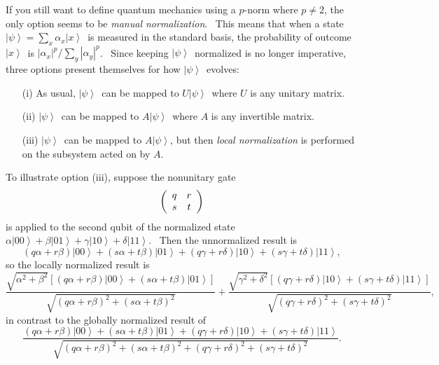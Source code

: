 \documentclass{article}%
\begin{document}
If you still want to define quantum mechanics using a $p$-norm where $p\neq2$,
the only option seems to be \textit{manual normalization}. \ This means that
when a state $\left\vert \psi\right\rangle =\sum_{x}\alpha_{x}\left\vert
x\right\rangle $\ is measured in the standard basis, the probability of
outcome $\left\vert x\right\rangle $\ is $\left\vert \alpha_{x}\right\vert
^{p}/\sum_{y}\left\vert \alpha_{y}\right\vert ^{p}$. \ Since keeping
$\left\vert \psi\right\rangle $\ normalized is no longer imperative, three
options present themselves for how $\left\vert \psi\right\rangle $\ evolves:

\begin{enumerate}
\item[(i)] As usual, $\left\vert \psi\right\rangle $\ can be mapped to
$U\left\vert \psi\right\rangle $\ where $U$ is any unitary matrix.

\item[(ii)] $\left\vert \psi\right\rangle $\ can be mapped to $A\left\vert
\psi\right\rangle $\ where $A$ is any invertible matrix.

\item[(iii)] $\left\vert \psi\right\rangle $\ can be mapped to $A\left\vert
\psi\right\rangle $, but then \textit{local normalization} is performed on the
subsystem acted on by $A$.
\end{enumerate}

To illustrate option (iii), suppose the nonunitary gate%
\[
\left(
\begin{array}
[c]{cc}%
q & r\\
s & t
\end{array}
\right)
\]
is applied to the second qubit of the normalized state $\alpha\left|
00\right\rangle +\beta\left|  01\right\rangle +\gamma\left|  10\right\rangle
+\delta\left|  11\right\rangle $. \ Then the unnormalized result is%
\[
\left(  q\alpha+r\beta\right)  \left|  00\right\rangle +\left(  s\alpha
+t\beta\right)  \left|  01\right\rangle +\left(  q\gamma+r\delta\right)
\left|  10\right\rangle +\left(  s\gamma+t\delta\right)  \left|
11\right\rangle ,
\]
so the locally normalized result is%
\[
\frac{\sqrt{\alpha^{2}+\beta^{2}}\left[  \left(  q\alpha+r\beta\right)
\left|  00\right\rangle +\left(  s\alpha+t\beta\right)  \left|
01\right\rangle \right]  }{\sqrt{\left(  q\alpha+r\beta\right)  ^{2}+\left(
s\alpha+t\beta\right)  ^{2}}}+\frac{\sqrt{\gamma^{2}+\delta^{2}}\left[
\left(  q\gamma+r\delta\right)  \left|  10\right\rangle +\left(
s\gamma+t\delta\right)  \left|  11\right\rangle \right]  }{\sqrt{\left(
q\gamma+r\delta\right)  ^{2}+\left(  s\gamma+t\delta\right)  ^{2}}},
\]
in contrast to the globally normalized result of%
\[
\frac{\left(  q\alpha+r\beta\right)  \left|  00\right\rangle +\left(
s\alpha+t\beta\right)  \left|  01\right\rangle +\left(  q\gamma+r\delta
\right)  \left|  10\right\rangle +\left(  s\gamma+t\delta\right)  \left|
11\right\rangle }{\sqrt{\left(  q\alpha+r\beta\right)  ^{2}+\left(
s\alpha+t\beta\right)  ^{2}+\left(  q\gamma+r\delta\right)  ^{2}+\left(
s\gamma+t\delta\right)  ^{2}}}.
\]
\end{document}
